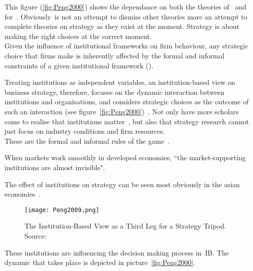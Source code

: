 


This figure (\ref{fig:Peng2000}) shows the dependance on both the theories of~\cite{Barney:2001} and~\cite{Porter:1980} for~\ibv. Obviously~\ibv is not an attempt to dismiss other theories more an attempt to complete theories on strategy as they exist at the moment. Strategy is about making the right choices at the correct moment. \\

Given the influence of institutional frameworks on firm behaviour, any strategic choice that firms make is inherently affected by the formal and informal constraints of a given institutional framework (\cite{North:1990,Oliver:1997}). 




Treating institutions as independent variables, an institution-based view on business strategy, therefore, focuses on the dynamic interaction between institutions and organisations, and considers strategic choices as the outcome of such an interaction (see figure~\ref{fig:Peng2000})~\cite{Peng:2002}.
Not only have more scholars come to realise that institutions matter~\cite{Powell:1991,Scott:1995}, but also that strategy research cannot just focus on industry conditions and firm resources.~\cite{Khanna:1997}\\

These are the formal and informal rules of the game~\cite{North:1990}. 








When markets work smoothly in developed economies, ``the market-supporting institutions are almost invisible".~\cite{McMillan:2008}

The effect of institutions on strategy can be seen most obviously in the asian economies~\cite{Peng:2002}.

\begin{figure}[htbp!] 
      \label{fig:Peng2009}
	\centering
	\texttt{[image: Peng2009.png]}
 	\caption{The Institution-Based View as a Third Leg for a Strategy Tripod. Source:~\cite{Peng:2009}}
\end{figure}









These institutions are influencing the decision making process in~\gls{IB}.  The dynamic that takes place is depicted in picture~\ref{fig:Peng2000}. 


